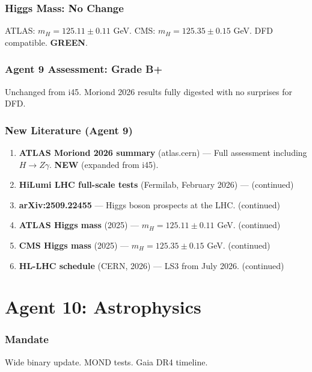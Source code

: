 \documentclass[11pt,a4paper]{article}
\newcommand{\GREEN}{\textcolor{dfdgreen}{\textbf{GREEN}}}
\newcommand{\NEW}{\textcolor{dfdblue}{\textbf{NEW}}}
\begin{document}
\section{Higgs Mass: No Change}

ATLAS: $m_H = 125.11 \pm 0.11$ GeV. CMS: $m_H = 125.35 \pm 0.15$ GeV. DFD compatible. \GREEN.

\section{Agent 9 Assessment: Grade B+}

Unchanged from i45. Moriond 2026 results fully digested with no surprises for DFD.

\section{New Literature (Agent 9)}

\begin{enumerate}
\item \textbf{ATLAS Moriond 2026 summary} (atlas.cern) --- Full assessment including $H \to Z\gamma$. \NEW{} (expanded from i45).
\item \textbf{HiLumi LHC full-scale tests} (Fermilab, February 2026) --- (continued)
\item \textbf{arXiv:2509.22455} --- Higgs boson prospects at the LHC. (continued)
\item \textbf{ATLAS Higgs mass} (2025) --- $m_H = 125.11 \pm 0.11$ GeV. (continued)
\item \textbf{CMS Higgs mass} (2025) --- $m_H = 125.35 \pm 0.15$ GeV. (continued)
\item \textbf{HL-LHC schedule} (CERN, 2026) --- LS3 from July 2026. (continued)
\end{enumerate}


\part{Agent 10: Astrophysics}
\label{part:agent10}

\section{Mandate}

Wide binary update. MOND tests. Gaia DR4 timeline.
\end{document}
